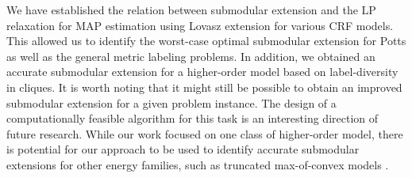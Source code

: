 \label{sec:conclude}
We have established the relation between submodular extension and the LP
relaxation for MAP estimation using Lovasz extension for various CRF models. This
allowed us to identify the worst-case optimal submodular extension for Potts as
well as the general metric labeling problems. In addition, we obtained an
accurate submodular extension for a higher-order model based on label-diversity
in cliques. It is worth noting that it might still be possible to obtain an
improved submodular extension for a given problem instance. The design of
a computationally feasible algorithm for this task is an interesting direction
of future research. While our work focused on one class of higher-order model,
there is potential for our approach to be used to identify accurate submodular
extensions for other energy families, such as truncated max-of-convex models \citep{pansari2017truncated}. 
\newpage

